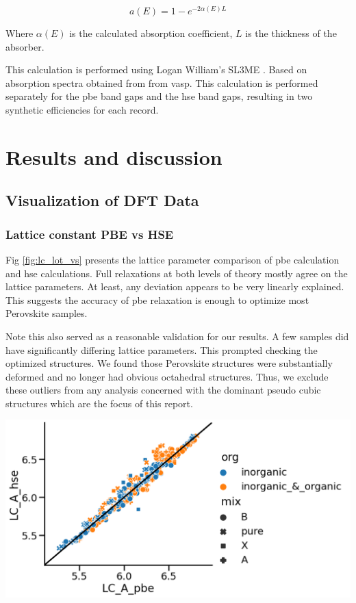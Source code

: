 \documentclass[twoside, twocolumn, 9pt, draft]{article}
\begin{document}
\begin{equation}\label{eq:absorption_alpha}
a(E)=1-e^{-2\alpha(E)L}
\end{equation}

Where \(\alpha(E)\) is the calculated absorption coefficient, \(L\) is
the thickness of the absorber.

This calculation is performed using Logan William's SL3ME
\cite{williams-2022-sl3me}. Based on absorption spectra obtained from
from \gls{vasp}. This calculation is performed separately for the \acrshort{pbe} band
gaps and the \acrshort{hse} band gaps, resulting in two synthetic efficiencies
for each record.

\section*{Results and discussion}
\label{sec:org3dda365}
\subsection*{Visualization of DFT Data}
\label{sec:org6aec487}
\subsubsection*{Lattice constant PBE vs HSE}
\label{sec:org568e45c}
Fig \ref{fig:lc_lot_vs} presents the lattice parameter comparison of
\acrshort{pbe} calculation and \acrshort{hse}
calculations. Full relaxations at both levels of theory mostly agree
on the lattice parameters. At least, any deviation appears to be very
linearly explained. This suggests the accuracy of
\acrshort{pbe} relaxation is enough to optimize most Perovskite
samples.

Note this also served as a reasonable validation for our results. A
few samples did have significantly differing lattice parameters. This
prompted checking the optimized structures. We found those Perovskite
structures were substantially deformed and no longer had obvious
octahedral structures. Thus, we exclude these outliers from any
analysis concerned with the dominant pseudo cubic structures which are
the focus of this report.

\begin{center}
\includegraphics[width=.9\linewidth]{./expval/pbe_v_hse_LC.png}
\end{center}
\end{document}
